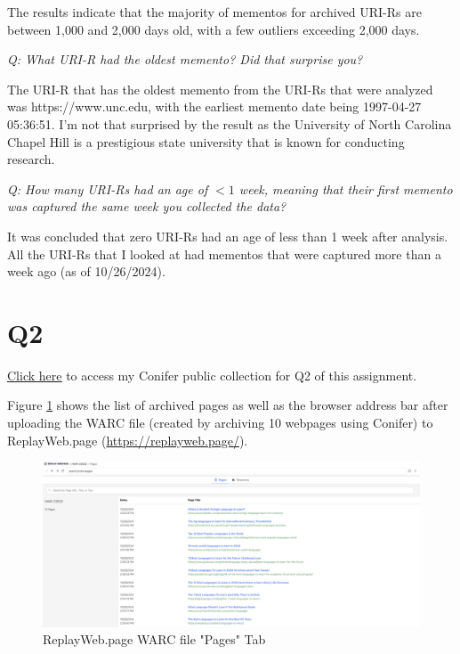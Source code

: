 \documentclass[12pt]{article}
\begin{document}
The results indicate that the majority of mementos for archived URI-Rs are between 1,000 and 2,000 days old, with a few outliers exceeding 2,000 days.

\emph{Q: What URI-R had the oldest memento? Did that surprise you?}

The URI-R that has the oldest memento from the URI-Rs that were analyzed was https://www.unc.edu, with the earliest memento date being 1997-04-27 05:36:51. I'm not that surprised by the result as the University of North Carolina Chapel Hill is a prestigious state university that is known for conducting research.

\emph{Q: How many URI-Rs had an age of $< 1$ week, meaning that their first memento was captured the same week you collected the data?}

It was concluded that zero URI-Rs had an age of less than 1 week after analysis. All the URI-Rs that I looked at had mementos that were captured more than a week ago (as of 10/26/2024).


\section*{Q2}

\href{https://conifer.rhizome.org/ethan746/hw4-cs532}{\uline{Click here}} to access my Conifer public collection for Q2 of this assignment.

Figure \ref{fig:replay} shows the list of archived pages as well as the browser address bar after uploading the WARC file (created by archiving 10 webpages using Conifer) to ReplayWeb.page (\url{https://replayweb.page/}).

\begin{figure}[h!]
    \centering
    \includegraphics[trim=0 0 0 0, clip, width=\textwidth] {replay.png}
    \caption{ReplayWeb.page WARC file "Pages" Tab}
    \label{fig:replay}
\end{figure}
\end{document}
